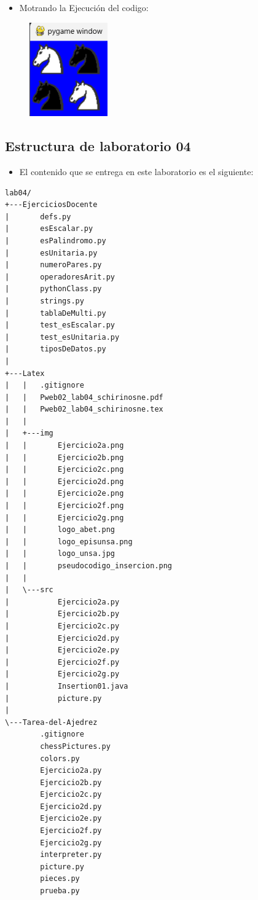 \documentclass{article}
\begin{document}
		

	\begin{itemize}	
		\item Motrando la Ejecución del codigo:
	\end{itemize}	
	
	\begin{figure}[H]
		\centering
		\includegraphics[width=0.3\textwidth,keepaspectratio]{img/Ejercicio2a.png}
	\end{figure}

		
	\subsection{Estructura de laboratorio 04}
	\begin{itemize}	
		\item El contenido que se entrega en este laboratorio es el siguiente:
	\end{itemize}
	
\begin{lstlisting}[style=ascii-tree]
lab04/
+---EjerciciosDocente
|       defs.py
|       esEscalar.py
|       esPalindromo.py
|       esUnitaria.py
|       numeroPares.py
|       operadoresArit.py
|       pythonClass.py
|       strings.py
|       tablaDeMulti.py
|       test_esEscalar.py
|       test_esUnitaria.py
|       tiposDeDatos.py
|
+---Latex
|   |   .gitignore
|   |   Pweb02_lab04_schirinosne.pdf
|   |   Pweb02_lab04_schirinosne.tex
|   |
|   +---img
|   |       Ejercicio2a.png
|   |       Ejercicio2b.png
|   |       Ejercicio2c.png
|   |       Ejercicio2d.png
|   |       Ejercicio2e.png
|   |       Ejercicio2f.png
|   |       Ejercicio2g.png
|   |       logo_abet.png
|   |       logo_episunsa.png
|   |       logo_unsa.jpg
|   |       pseudocodigo_insercion.png
|   |
|   \---src
|           Ejercicio2a.py
|           Ejercicio2b.py
|           Ejercicio2c.py
|           Ejercicio2d.py
|           Ejercicio2e.py
|           Ejercicio2f.py
|           Ejercicio2g.py
|           Insertion01.java
|           picture.py
|
\---Tarea-del-Ajedrez
        .gitignore
        chessPictures.py
        colors.py
        Ejercicio2a.py
        Ejercicio2b.py
        Ejercicio2c.py
        Ejercicio2d.py
        Ejercicio2e.py
        Ejercicio2f.py
        Ejercicio2g.py
        interpreter.py
        picture.py
        pieces.py
        prueba.py
\end{lstlisting}    
\end{document}
